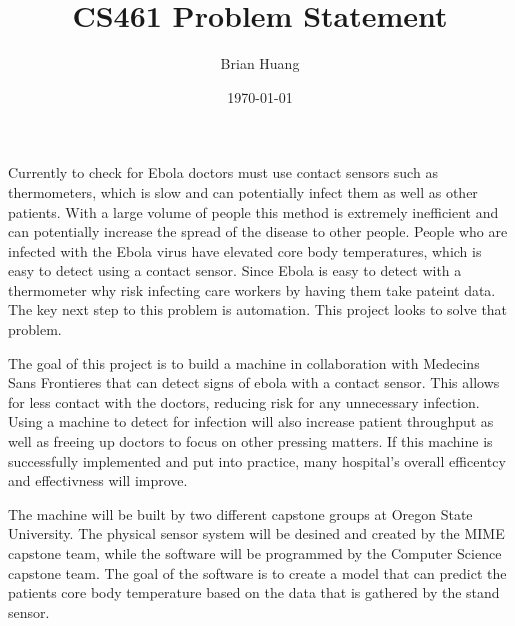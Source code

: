 \documentclass [10pt, titlepage]{article}
\begin{document}
\title{CS461 Problem Statement}
\author{Brian Huang}
\date{\today}
\maketitle

Currently to check for Ebola doctors must use contact sensors such as thermometers, which is slow and can
potentially infect them as well as other patients. With a large volume of people this method is extremely inefficient and can potentially increase the spread of the disease to 
other people. People who are infected with the Ebola virus have elevated core body temperatures, which is easy to detect using a contact sensor. Since Ebola
is easy to detect with a thermometer why risk infecting care workers by having them take pateint data. The key next step to this problem is automation. This project
looks to solve that problem.\par


The goal of this project is to build a machine in collaboration with Medecins Sans Frontieres that can detect signs of ebola with a contact sensor.
This allows for less contact with the doctors, reducing risk for any unnecessary infection. Using a machine to detect for infection will also increase
patient throughput as well as freeing up doctors to focus on other pressing matters. If this machine is successfully implemented and put into practice,
many hospital's overall efficentcy and effectivness will improve.\par


The machine will be built by two different capstone groups at Oregon State University. The physical sensor system will be desined and created by the MIME
capstone team, while the software will be programmed by the Computer Science capstone team. The goal of the software is to create a model that can predict
the patients core body temperature based on the data that is gathered by the stand sensor.\par
\end{document}
